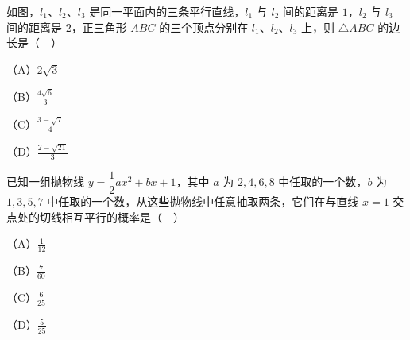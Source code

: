 \begin{question}
如图，$l_1$、$l_2$、$l_3$ 是同一平面内的三条平行直线，$l_1$ 与 $l_2$ 间的距离是 $1$，$l_2$ 与 $l_3$ 间的距离是 $2$，正三角形 $ABC$ 的三个顶点分别在 $l_1$、$l_2$、$l_3$ 上，则 $\triangle ABC$ 的边长是（　）
\nopagebreak[4]
\begin{center}\end{center}
\nopagebreak[4]
（A）$2\sqrt3$

（B）$\frac{4\sqrt6}{3}$

（C）$\frac{3-\sqrt7}{4}$

（D）$\frac{2-\sqrt{21}}{3}$

\end{question}
\begin{question}
已知一组抛物线 $y=\dfrac12ax^2+bx+1$，其中 $a$ 为 $2,4,6,8$ 中任取的一个数，$b$ 为 $1,3,5,7$ 中任取的一个数，从这些抛物线中任意抽取两条，它们在与直线 $x=1$ 交点处的切线相互平行的概率是（　）

（A）$\frac1{12}$

（B）$\frac{7}{60}$

（C）$\frac6{25}$

（D）$\frac5{25}$

\end{question}

